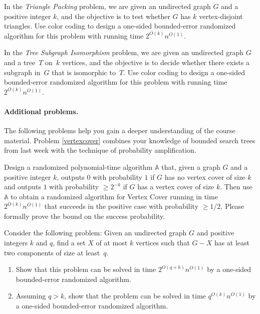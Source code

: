 \documentclass[english]{uebung_cs}
\begin{document}
\begin{exercise}
  In the \emph{Triangle Packing} problem, we are given an undirected graph $G$ and a positive integer $k$, and the objective is to test whether $G$ has $k$ vertex-disjoint triangles. Use color coding to design a one-sided bounded-error randomized algorithm for this problem with running time $2^{O(k)} n^{O(1)}$.
\end{exercise}


\begin{exercise}
  In the \emph{Tree Subgraph Isomorphism} problem, we are given an undirected graph $G$ and a tree~$T$ on~$k$ vertices, and the objective is to decide whether there exists a subgraph in~$G$ that is isomorphic to~$T$. Use color coding to design a one-sided bounded-error randomized algorithm for this problem with running time $2^{O(k)}n^{O(1)}$.
\end{exercise}

\sepline
\paragraph*{Additional problems.} The following problems help you gain a deeper understanding of the course material. Problem \ref{vertexcover} combines your knowledge of bounded search trees from last week with the technique of probability amplification.

\begin{exercise}\label{vertexcover}
  Design a randomized polynomial-time algorithm $\mathbb{A}$ that, given a graph $G$ and a positive integer $k$, outputs $0$ with probability $1$ if $G$ has no vertex cover of size $k$ and outputs $1$ with probability $\geq 2^{-k}$ if $G$ has a vertex cover of size $k$.
  Then use $\mathbb{A}$ to obtain a randomized algorithm for Vertex Cover running in time $2^{O(k)} n^{O(1)}$ that succeeds in the positive case with probability $\geq 1/2$. Please formally prove the bound on the success probability.
\end{exercise}

\begin{exercise}
  Consider the following problem: Given an undirected graph $G$ and positive integers $k$ and $q$, find a set $X$ of at most $k$ vertices such that $G - X$ has at least two components of size at least~$q$.
  \begin{enumerate}
    \item%
          Show that this problem can be solved in time $2^{O(q+k)}n^{O(1)}$ by a one-sided bounded-error randomized algorithm.
    \item Assuming $q>k$, show that the problem can be solved in time $q^{O(k)}n^{O(1)}$ by a one-sided bounded-error randomized algorithm.
  \end{enumerate}
\end{exercise}
\end{document}
